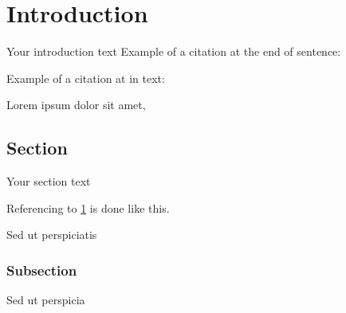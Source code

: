 \chapter{Introduction}\label{chapter:introduction} 
Your introduction text
Example of a citation at the end of sentence: \autocite{testcite}

Example of a citation at in text: \textcite{testcite}


Lorem ipsum dolor sit amet,



\section{Section}\label{section:section}
Your section text

Referencing to \cref{chapter:introduction} is done like this. 

Sed ut perspiciatis 

\subsection{Subsection}

Sed ut perspicia

